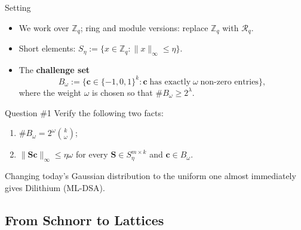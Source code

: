 \documentclass{zkdl-presentation-template}
\begin{document}
    \begin{frame}{Setting}
        \begin{itemize}
            \item We work over $\mathbb{Z}_q$; ring and module versions: replace $\mathbb{Z}_q$ with $\mathcal{R}_q$.
            \item Short elements: $S_{\eta} := \{x \in \mathbb{Z}_q: \|x\|_{\infty} \leq \eta\}$.\pause
            \item The \textbf{challenge set}
            \begin{equation*}
                B_{\omega} := \{\mathbf{c} \in \{-1,0,1\}^k: \mathbf{c} \; \text{has exactly} \; \omega \; \text{non-zero entries}\},
            \end{equation*}
            where the weight $\omega$ is chosen so that $\#B_{\omega} \geq 2^{\lambda}$.
        \end{itemize}
        \pause

        \begin{questionblock}{Question \#1}
            Verify the following two facts:
            \begin{enumerate}
                \item $\#B_{\omega} = 2^{\omega}\binom{k}{\omega}$;
                \item $\|\mathbf{S}\mathbf{c}\|_{\infty} \leq \eta\omega$ for every $\mathbf{S} \in S_{\eta}^{m \times k}$ and $\mathbf{c} \in B_{\omega}$.
            \end{enumerate}
        \end{questionblock}
        \pause

        \begin{remark}
            Changing today's Gaussian distribution to the uniform one almost immediately gives Dilithium (ML-DSA).
        \end{remark}
    \end{frame}

    \subsection{From Schnorr to Lattices}
\end{document}
